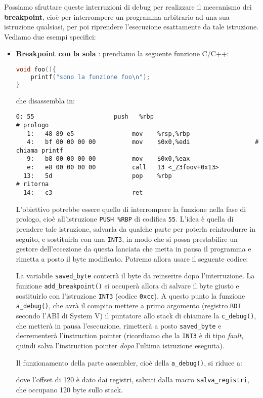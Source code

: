 \documentclass[a4paper,11pt]{article}
\begin{document}
Possiamo sfruttare queste interruzioni di debug per realizzare il meccanismo dei \textbf{breakpoint}, cioè per interrompere un programma arbitrario ad una sua istruzione qualsiasi, per poi riprendere l'esecuzione esattamente da tale istruzione.
Vediamo due esempi specifici:
\begin{itemize}
	\item \textbf{Breakpoint con la sola }: prendiamo la seguente funzione C/C++:
\begin{lstlisting}[language=C++, style=codestyle]	
void foo(){
    printf("sono la funzione foo\n");
}
\end{lstlisting}
che disassembla in:
\begin{lstlisting}[language=assembler, style=codestyle]	
	 0:	55                   	push   %rbp								# prologo
   1:	48 89 e5             	mov    %rsp,%rbp
   4:	bf 00 00 00 00       	mov    $0x0,%edi				  # chiama printf
   9:	b8 00 00 00 00       	mov    $0x0,%eax
   e:	e8 00 00 00 00       	call   13 <_Z3foov+0x13>
  13:	5d                   	pop    %rbp								# ritorna
  14:	c3                   	ret
\end{lstlisting}
L'obiettivo potrebbe essere quello di interrompere la funzione nella fase di prologo, cioè all'istruzione \lstinline|PUSH %RBP| di codifica \lstinline|55|.
L'idea è quella di prendere tale istruzione, salvarla da qualche parte per poterla reintrodurre in seguito, e sostituirla con una \lstinline|INT3|, in modo che si possa prestabilire un gestore dell'eccezione da questa lanciata che metta in pausa il programma e rimetta a posto il byte modificato.
Potremo allora usare il seguente codice:
\lstset{style=codestyle, language=c++}

La variabile \lstinline|saved_byte| conterrà il byte da reinserire dopo l'interruzione.
\lstset{style=codestyle, language=assembler}
La funzione \lstinline|add_breakpoint()| si occuperà allora di salvare il byte giusto e sostituirlo con l'istruzione \lstinline|INT3| (codice \lstinline|0xcc|).
A questo punto la funzione \lstinline|a_debug()|, che avrà il compito mettere a primo argomento (registro \lstinline|RDI| secondo l'ABI di System V) il puntatore allo stack di chiamare la \lstinline|c_debug()|, che metterà in pausa l'esecuzione, rimetterà a posto \lstinline|saved_byte| e decrementerà l'instruction pointer (ricordiamo che la \lstinline|INT3| è di tipo \textit{fault}, quindi salva l'instruction pointer \textit{dopo} l'ultima istruzione eseguita).

Il funzionamento della parte assembler, cioè della \lstinline|a_debug()|, si riduce a:

dove l'offset di 120 è dato dai registri, salvati dalla macro \lstinline|salva_registri|, che occupano 120 byte sullo stack.


\end{itemize}
\end{document}
